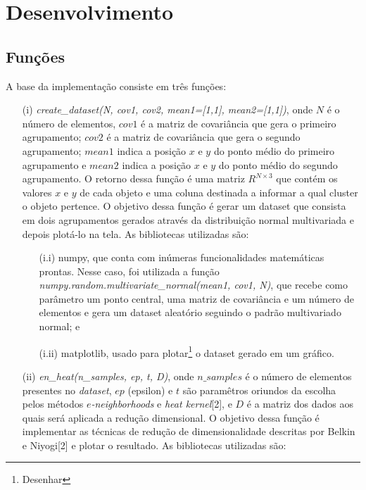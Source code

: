 \documentclass[a4paper,12pt]{article}    %
\begin{document}
\section{Desenvolvimento}

\subsection{Funções}

A base da implementação consiste em três funções:

\begin{itemize}
	\item[(i)] \textit{create\_dataset(N, cov1, cov2, mean1=[1,1], mean2=[1,1])}, onde $N$ é o número de elementos, $cov1$ é a matriz de covariância que gera o primeiro agrupamento; $cov2$ é a matriz de covariância que gera o segundo agrupamento; $mean1$ indica a posição $x$ e $y$ do ponto médio do primeiro agrupamento e $mean2$ indica a posição $x$ e $y$ do ponto médio do segundo agrupamento. O retorno dessa função é uma matriz $R^{N \times 3}$ que contém os valores $x$ e $y$ de cada objeto e uma coluna destinada a informar a qual cluster o objeto pertence. O objetivo dessa função é gerar um dataset que consista em dois agrupamentos gerados através da distribuição normal multivariada e depois plotá-lo na tela. As bibliotecas utilizadas são: 
	\begin{itemize}
		\item[(i.i)] numpy, que conta com inúmeras funcionalidades matemáticas prontas. Nesse caso, foi utilizada a função \textit{numpy.random.multivariate\_normal(mean1, cov1, N)}, que recebe como parâmetro um ponto central, uma matriz de covariância e um número de elementos e gera um dataset aleatório seguindo o padrão multivariado normal; e
		\item[(i.ii)] matplotlib, usado para plotar\footnote{Desenhar} o dataset gerado em um gráfico.
	\end{itemize}
	\item[(ii)] \textit{en\_heat(n\_samples, ep, t, D)}, onde $n\_samples$ é o número de elementos presentes no \textit{dataset}, $ep$ (epsilon) e $t$ são paramêtros oriundos da escolha pelos métodos \textit{$e$-neighborhoods} e \textit{heat kernel}[2], e $D$ é a matriz dos dados aos quais será aplicada a redução dimensional. O objetivo dessa função é implementar as técnicas de redução de dimensionalidade descritas por Belkin e Niyogi[2] e plotar o resultado. As bibliotecas utilizadas são:
		\begin{itemize}

\end{itemize}
\end{itemize}
\end{document}
